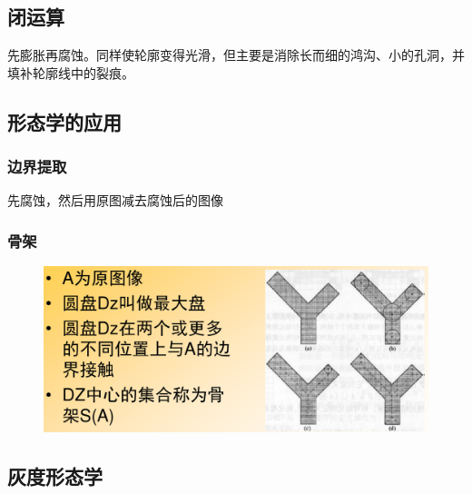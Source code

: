 \documentclass[11pt]{article}
\begin{document}
\subsection{闭运算}
先膨胀再腐蚀。同样使轮廓变得光滑，但主要是消除长而细的鸿沟、小的孔洞，并填补轮廓线中的裂痕。

\subsection{形态学的应用}

\subsubsection{边界提取}
先腐蚀，然后用原图减去腐蚀后的图像

\subsubsection{骨架}
\begin{figure}[htb]
    \centering
    \includegraphics[scale=0.1]{imgs/bones.png}
\end{figure}

\subsection{灰度形态学}
\end{document}
